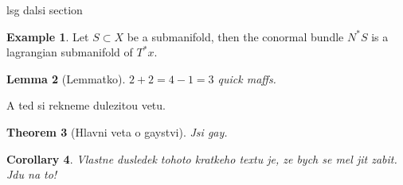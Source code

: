 \documentclass{article}
\newtheorem{theorem}{Theorem}
\newtheorem{lemma}[theorem]{Lemma} %
\newtheorem{corollary}[theorem]{Corollary}
\theoremstyle{definition}
\newtheorem{example}[theorem]{Example}
\begin{document}
lsg dalsi section
\begin{example}
    Let $S \subset X$ be a submanifold, then the conormal bundle $N^*S$ is a lagrangian submanifold of $T^*x$.
\end{example}

\begin{lemma}[Lemmatko]
$2+2 = 4 - 1 = 3$ quick maffs.
\end{lemma}

A ted si rekneme dulezitou vetu.
\begin{theorem}[Hlavni veta o gaystvi]
Jsi gay.
\end{theorem}


\begin{corollary}
    Vlastne dusledek tohoto kratkeho textu je, ze bych se mel jit zabit. Jdu na to!
\end{corollary}
\end{document}
